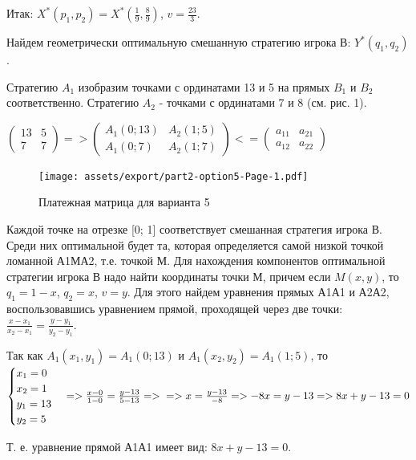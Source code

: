 Итак: $X^*(p_1, p_2) = X^*(\frac{1}{9}, \frac{8}{9})$, $v=\frac{23}{3}$.

Найдем геометрически оптимальную смешанную стратегию игрока В: $Y^*(q_1, q_2)$.

Стратегию $A_1$ изобразим точками с ординатами 13 и 5 на прямых $B_1$ и $B_2$ соответственно.
Стратегию $A_2$ - точками с ординатами 7 и 8 (см. рис. 1).

$\begin{pmatrix}
  13&5\\
  7&7
\end{pmatrix} =>
\begin{pmatrix}
  A_1(0; 13)  &A_2(1; 5)\\
  A_1(0; 7)   &A_2(1; 7)
\end{pmatrix} <=
\begin{pmatrix}
  a_{11}      &a_{21}\\
  a_{12}      &a_{22}
\end{pmatrix}$

\begin{figure}[!h]
  \centering

  \texttt{[image: assets/export/part2-option5-Page-1.pdf]}

  \caption{Платежная матрица для варианта 5}

  \label{fig:part1_option5_matrix}
\end{figure}

Каждой точке на отрезке [0; 1] соответствует смешанная стратегия игрока В.
Среди них оптимальной будет та, которая определяется самой низкой точкой ломанной А1МА2, т.е. точкой М.
Для нахождения компонентов оптимальной стратегии игрока В надо найти координаты точки М,
причем если $M(x, y)$, то $q_1 = 1 - x$, $q_2 = x$, $v = y$.
Для этого найдем уравнения прямых А1А1 и А2А2, воспользовавшись уравнением прямой, проходящей через две точки:
$\frac{x-x_1}{x_2 - x_1} = \frac{y-y_1}{y_2 - y_1}$.

Так как $A_1(x_1, y_1) = A_1(0; 13)$ и $A_1(x_2, y_2) = A_1(1; 5)$, то $\begin{cases}
  x_1 = 0 \\
  x_2 = 1 \\
  y_1 = 13 \\
  y_2 = 5
\end{cases} => \frac{x-0}{1 - 0} = \frac{y-13}{5 - 13} => \\
=> x = \frac{y-13}{-8} => -8 x = y - 13 => 8x + y - 13 = 0$

Т. е. уравнение прямой А1А1 имеет вид: $8x + y - 13 = 0$.

